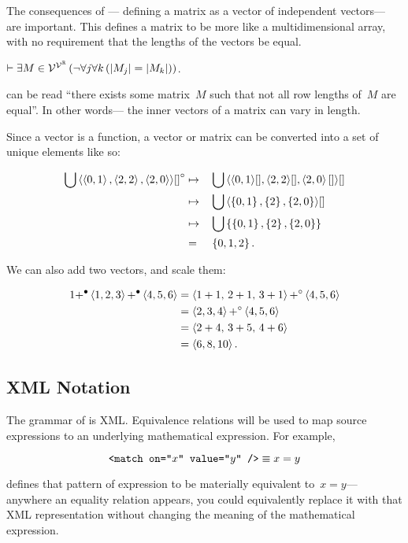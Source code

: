 The consequences of ---%
  defining a matrix as a vector of independent vectors---%
  are important.
This defines a matrix to be more like a multidimensional array,
  with no requirement that the lengths of the vectors be equal.

\begin{corollary}
  $\infer \Exists{M\in\Matrices}{\neg\Forall*{j}{\Forall{k}{\len{M_j} = \len{M_k}}}}$.
\end{corollary}

 can be read ``there exists some matrix~$M$ such that
  not all row lengths of~$M$ are equal''.
In other words---%
  the inner vectors of a matrix can vary in length.

Since a vector is a function,
  a vector or matrix can be converted into a set of unique elements like so:

\begin{alignat*}{2}
  \bigcup\left\langle\left\langle0,1\right\rangle,\left\langle2,2\right\rangle,\left\langle2,0\right\rangle\right\rangle\!{[]}^\circ
    &\mapsto &&\bigcup\left\langle\left\langle0,1\right\rangle\![],\left\langle2,2\right\rangle\![],\left\langle2,0\right\rangle[]\right\rangle\![] \\
    &\mapsto &&\bigcup\left\langle\left\{0,1\right\},\left\{2\right\},\left\{2,0\right\}\right\rangle\![] \\
    &\mapsto &&\bigcup\left\{\left\{0,1\right\},\left\{2\right\},\left\{2,0\right\}\right\} \\
    &=       &&\left\{0,1,2\right\}.
\end{alignat*}

We can also add two vectors, and scale them:

\begin{align*}
  1 {+}^\bullet \left\langle1,2,3\right\rangle {+}^\bullet \left\langle4,5,6\right\rangle
    &= \left\langle1+1,\, 2+1,\, 3+1\right\rangle {+}^\circ \left\langle4,5,6\right\rangle \\
    &= \left\langle2,3,4\right\rangle {+}^\circ \left\langle4,5,6\right\rangle \\
    &= \left\langle2+4,\, 3+5,\, 4+6\right\rangle \\
    &= \left\langle6, 8, 10\right\rangle.
\end{align*}


\subsection{XML Notation}
The grammar of \tame{} is XML.
Equivalence relations will be used to map source expressions to an
  underlying mathematical expression.
For example,

\begin{equation*}
  \texttt{<match on="$x$" value="$y$" />} \equiv x = y
\end{equation*}

\noindent
defines that pattern of  expression to be materially
  equivalent to~$x=y$---%
    anywhere an equality relation appears,
      you could equivalently replace it with that XML representation without
        changing the meaning of the mathematical expression.
